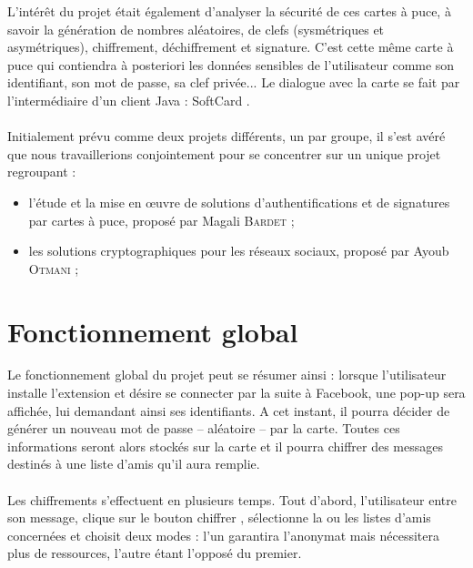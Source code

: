 \documentclass[a4paper,11pt,french]{article}
\begin{document}
L'intérêt du projet était également d'analyser la sécurité de ces cartes à puce,
à savoir la génération de nombres aléatoires, de clefs (sysmétriques et 
asymétriques), chiffrement, déchiffrement et signature. C'est cette même carte
à puce qui contiendra à posteriori les données sensibles de l’utilisateur 
comme son identifiant, son mot de passe, sa clef privée... Le dialogue avec 
la carte se fait par l’intermédiaire d’un client Java : \og{}SoftCard \fg{}. 

\paragraph{}
Initialement prévu comme deux projets différents, un par groupe, il s'est avéré 
que nous travaillerions conjointement pour se concentrer sur un unique projet 
regroupant :
\begin{itemize}
    \item l'étude et la mise en \oe{}uvre de solutions d’authentifications et 
        de signatures par cartes à puce, proposé par Magali \textsc{Bardet} ;
    \item les solutions cryptographiques pour les réseaux sociaux, proposé par Ayoub
        \textsc{Otmani} ;
\end{itemize}

\section{Fonctionnement global}
Le fonctionnement global du projet peut se résumer ainsi : lorsque l'utilisateur
installe l'extension et désire se connecter par la suite à Facebook,
une \og pop-up \fg{} sera affichée, lui demandant ainsi ses identifiants. A cet
instant, il pourra décider de générer un nouveau mot de passe -- aléatoire -- par
la carte. Toutes ces informations seront alors stockés sur la carte et il pourra
chiffrer des messages destinés à une liste d'amis qu'il aura remplie. 

\paragraph{}
Les chiffrements s'effectuent en plusieurs temps. Tout d'abord, l'utilisateur 
entre son message, clique sur le bouton \og chiffrer \fg{}, sélectionne la ou les
listes d'amis concernées et choisit deux modes : l'un garantira l'anonymat mais
nécessitera plus de ressources, l'autre étant l'opposé du premier.
\end{document}
